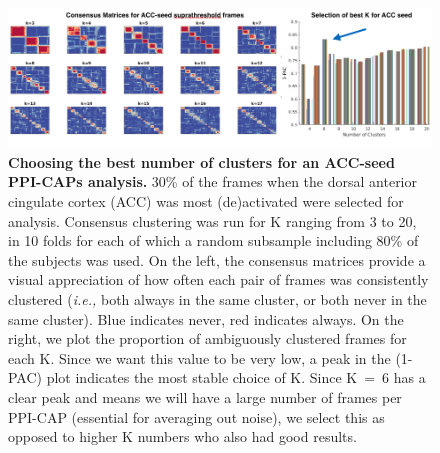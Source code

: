 \begin{figure}[h]
\centering
\includegraphics[width=1\textwidth]{images/Appendix/Appendix_Ch4_ACC_K.png}
\caption{\textbf{Choosing the best number of clusters for an ACC-seed PPI-CAPs analysis.} 30\% of the frames when the dorsal anterior cingulate cortex (ACC) was most (de)activated were selected for analysis. Consensus clustering was run for K ranging from 3 to 20, in 10 folds for each of which a random subsample including 80\% of the subjects was used. On the left, the consensus matrices provide a visual appreciation of how often each pair of frames was consistently clustered (\textit{i.e.,} both always in the same cluster, or both never in the same cluster). Blue indicates never, red indicates always. On the right, we plot the proportion of ambiguously clustered frames for each K. Since we want this value to be very low, a peak in the (1-PAC) plot indicates the most stable choice of K. Since K~=~6 has a clear peak and means we will have a large number of frames per PPI-CAP (essential for averaging out noise), we select this as opposed to higher K numbers who also had good results.}
\label{fig:app_acc_k}
\end{figure}





